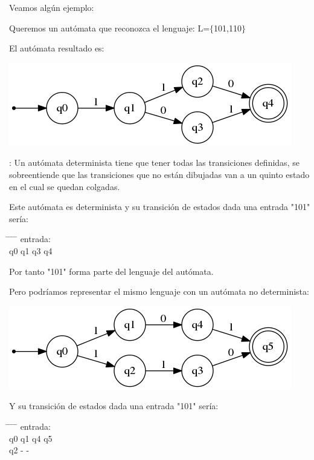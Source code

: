 \documentclass{apuntes}
\begin{document}
Veamos algún ejemplo:
\begin{example} 
Queremos un autómata que reconozca el lenguaje: L=$\lbrace$101,110$\rbrace$

El autómata resultado es:
\begin{center}
\includegraphics[scale=0.75]{automata2.png}
\end{center}
\obs: Un autómata determinista tiene que tener todas las transiciones definidas, se sobreentiende que las transiciones que no están dibujadas van a un quinto estado en el cual se quedan colgadas.

Este autómata es determinista y su transición de estados dada una entrada "101" sería:

 \begin{tabbing}
   \hspace*{2cm} \= \hspace*{2cm} \= \hspace*{2cm} \= \hspace*{2cm} \= \kill
  entrada:         \\
 q0 \> q1 \> q3 \> q4  \\
 \end{tabbing}

Por tanto "101" forma parte del lenguaje del autómata.

Pero podríamos representar el mismo lenguaje con un autómata no determinista:
\begin{center}
\includegraphics[scale=0.75]{automata3.png}
\end{center}
Y su transición de estados dada una entrada "101" sería:

 \begin{tabbing}
   \hspace*{2cm} \= \hspace*{2cm} \= \hspace*{2cm} \= \hspace*{2cm} \= \kill
  entrada:         \\
 q0 \> q1 \> q4 \> q5\\
  \> q2 \> - \> - \\


\end{tabbing}
\end{example}
\end{document}
